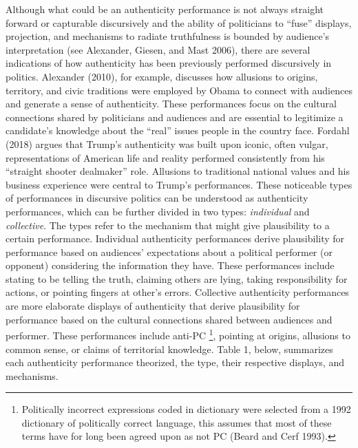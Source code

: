 \documentclass[smallextended]{svjour3}       %
\begin{document}
Although what could be an authenticity performance is not always
straight forward or capturable discursively and the ability of
politicians to ``fuse'' displays, projection, and mechanisms to radiate
truthfulness is bounded by audience's interpretation (see Alexander,
Giesen, and Mast 2006), there are several indications of how
authenticity has been previously performed discursively in politics.
Alexander (2010), for example, discusses how allusions to origins,
territory, and civic traditions were employed by Obama to connect with
audiences and generate a sense of authenticity. These performances focus
on the cultural connections shared by politicians and audiences and are
essential to legitimize a candidate's knowledge about the ``real''
issues people in the country face. Fordahl (2018) argues that Trump's
authenticity was built upon iconic, often vulgar, representations of
American life and reality performed consistently from his ``straight
shooter dealmaker'' role. Allusions to traditional national values and
his business experience were central to Trump's performances. These
noticeable types of performances in discursive politics can be
understood as authenticity performances, which can be further divided in
two types: \emph{individual} and \emph{collective}. The types refer to
the mechanism that might give plausibility to a certain performance.
Individual authenticity performances derive plausibility for performance
based on audiences' expectations about a political performer (or
opponent) considering the information they have. These performances
include stating to be telling the truth, claiming others are lying,
taking responsibility for actions, or pointing fingers at other's
errors. Collective authenticity performances are more elaborate displays
of authenticity that derive plausibility for performance based on the
cultural connections shared between audiences and performer. These
performances include anti-PC \footnote{ Politically incorrect
  expressions coded in dictionary were selected from a 1992 dictionary
  of politically correct language, this assumes that most of these terms
  have for long been agreed upon as not PC (Beard and Cerf 1993).},
pointing at origins, allusions to common sense, or claims of territorial
knowledge. Table 1, below, summarizes each authenticity performance
theorized, the type, their respective displays, and mechanisms.
\end{document}
